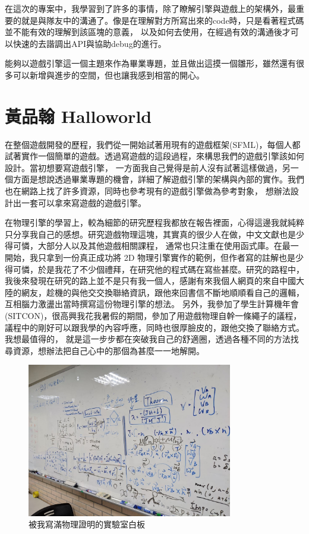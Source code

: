 在這次的專案中，我學習到了許多的事情，除了瞭解引擎與遊戲上的架構外，最重要的就是與隊友中的溝通了。像是在理解對方所寫出來的code時，只是看著程式碼並不能有效的理解到該區塊的意義，
以及如何去使用，在經過有效的溝通後才可以快速的去諧調出API與協助debug的進行。

能夠以遊戲引擎這一個主題來作為畢業專題，並且做出這摸一個雛形，雖然還有很多可以新增與進步的空間，但也讓我感到相當的開心。

\section{黃品翰 Halloworld}
\label{sec:Halloworld}

在整個遊戲開發的歷程，我們從一開始試著用現有的遊戲框架(SFML)，每個人都試著實作一個簡單的遊戲。透過寫遊戲的這段過程，來構思我們的遊戲引擎該如何設計。當初想要寫遊戲引擎，
一方面我自己覺得是前人沒有試著這樣做過，另一個方面是想說透過畢業專題的機會，詳細了解遊戲引擎的架構與內部的實作。我們也在網路上找了許多資源，同時也參考現有的遊戲引擎做為參考對象，
想辦法設計出一套可以拿來寫遊戲的遊戲引擎。

在物理引擎的學習上，較為細節的研究歷程我都放在報告裡面，心得這邊我就純粹只分享我自己的感想。研究遊戲物理這塊，其實真的很少人在做，中文文獻也是少得可憐，大部分人以及其他遊戲相關課程，
通常也只注重在使用函式庫。在最一開始，我只拿到一份真正成功將 2D 物理引擎實作的範例，但作者寫的註解也是少得可憐，於是我花了不少個禮拜，在研究他的程式碼在寫些甚麼。研究的路程中，
我後來發現在研究的路上並不是只有我一個人，感謝有來我個人網頁的來自中國大陸的網友，趁機的與他交交換聯絡資訊，跟他來回書信不斷地順順看自己的邏輯，互相腦力激盪出當時撰寫這份物理引擎的想法。
另外，我參加了學生計算機年會(SITCON)，很高興我花我暑假的期間，參加了用遊戲物理自幹一條繩子的議程，議程中的剛好可以跟我學的內容呼應，同時也很厚臉皮的，跟他交換了聯絡方式。我想最值得的，
就是這一步步都在突破我自己的舒適圈，透過各種不同的方法找尋資源，想辦法把自己心中的那個為甚麼一一地解開。

\begin{figure}[h]
    \begin{center}
    \includegraphics[width=0.8\textwidth]{./resources/ch6/halloworld_1.jpg}
    \end{center}
\caption{被我寫滿物理證明的實驗室白板}
\label{fig:ch6_whiteboard}
\end{figure}

